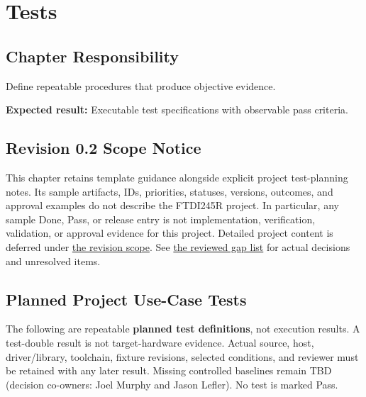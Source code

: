 \chapter{Tests}
\section{Chapter Responsibility}
\label{Section:TestsResponsibility}
Define repeatable procedures that produce objective evidence.

\noindent\textbf{Expected result:} Executable test specifications with observable pass criteria.

\section{Revision 0.2 Scope Notice}
\label{Section:DeferredTests}
\begin{fsaNote}
This chapter retains template guidance alongside explicit project test-planning notes.
Its sample artifacts, IDs, priorities, statuses, versions, outcomes, and
approval examples do not describe the FTDI245R project. In particular, any
sample Done, Pass, or release entry is not implementation, verification,
validation, or approval evidence for this project. Detailed project content
is deferred under \hyperref[Section:ProjectScope]{the revision scope}.
See \hyperref[Table:ProjectGapReview]{the reviewed gap list} for actual
decisions and unresolved items.
\end{fsaNote}

\section{Planned Project Use-Case Tests}
\label{Section:ProjectUseCaseTestPlan}
The following are repeatable \textbf{planned test definitions}, not execution
results. A test-double result is not target-hardware evidence. Actual source,
host, driver/library, toolchain, fixture revisions, selected conditions, and
reviewer must be retained with any later result. Missing controlled baselines
remain TBD (decision co-owners: Joel Murphy and Jason Lefler). No test is marked Pass.

\newpage
